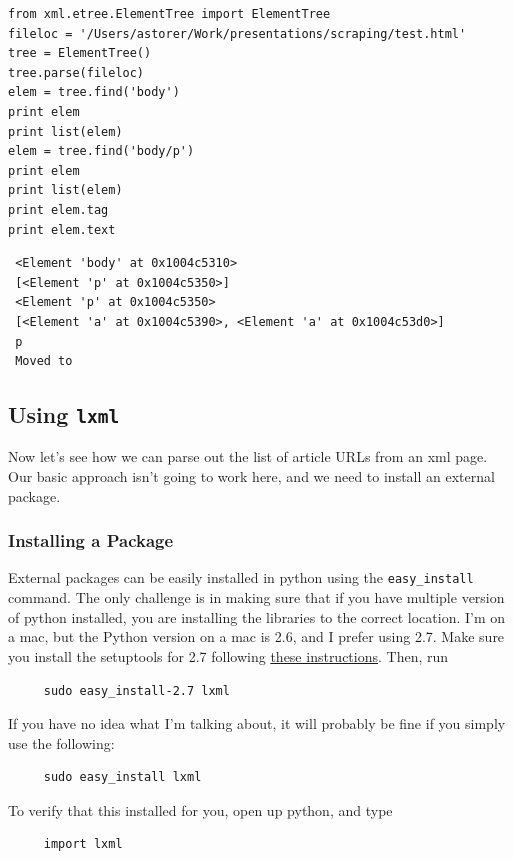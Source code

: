 \documentclass[11pt]{article}
\begin{document}
\begin{verbatim}
from xml.etree.ElementTree import ElementTree
fileloc = '/Users/astorer/Work/presentations/scraping/test.html'
tree = ElementTree()
tree.parse(fileloc)   
elem = tree.find('body')
print elem
print list(elem)
elem = tree.find('body/p')
print elem
print list(elem)
print elem.tag
print elem.text
\end{verbatim}

\begin{verbatim}
 <Element 'body' at 0x1004c5310>
 [<Element 'p' at 0x1004c5350>]
 <Element 'p' at 0x1004c5350>
 [<Element 'a' at 0x1004c5390>, <Element 'a' at 0x1004c53d0>]
 p
 Moved to 
\end{verbatim}
\subsection{Using \texttt{lxml}}
\label{sec-5-3}


   Now let's see how we can parse out the list of article URLs from
   an xml page.  Our basic approach isn't going to work here, and we
   need to install an external package.
\subsubsection{Installing a Package}
\label{sec-5-3-1}

    
    External packages can be easily installed in python using the
    \texttt{easy\_install} command.  The only challenge is in making sure that
    if you have multiple version of python installed, you are
    installing the libraries to the correct location.  I'm on a mac,
    but the Python version on a mac is 2.6, and I prefer using 2.7.
    Make sure you install the setuptools for 2.7 following
    \href{http://pypi.python.org/pypi/setuptools}{these instructions}.  Then, run

\begin{verbatim}
     sudo easy_install-2.7 lxml
\end{verbatim}
    
    If you have no idea what I'm talking about, it will probably be
    fine if you simply use the following:

\begin{verbatim}
     sudo easy_install lxml
\end{verbatim}

    To verify that this installed for you, open up python, and type

\begin{verbatim}
     import lxml
\end{verbatim}
\end{document}
